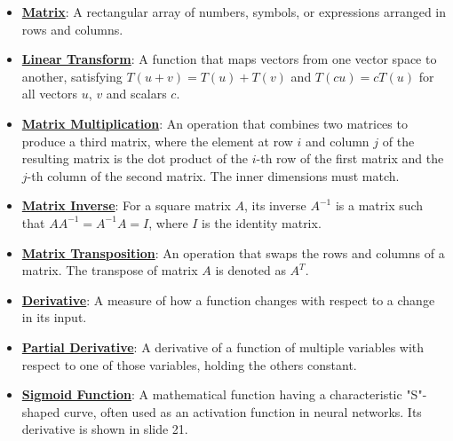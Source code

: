 \documentclass{article}%
\begin{document}
\begin{itemize}[leftmargin=*]%
\item \href{https://www.math.purdue.edu/~yipn/351/04L1-Linear Algebra Primer.pdf#page=4}{\textbf{Matrix}}: A rectangular array of numbers, symbols, or expressions arranged in rows and columns.%
\item \href{https://www.math.purdue.edu/~yipn/351/04L1-Linear Algebra Primer.pdf#page=5}{\textbf{Linear Transform}}: A function that maps vectors from one vector space to another, satisfying $T(u + v) = T(u) + T(v)$ and $T(cu) = cT(u)$ for all vectors $u$, $v$ and scalars $c$.%
\item \href{https://www.math.purdue.edu/~yipn/351/04L1-Linear Algebra Primer.pdf#page=14}{\textbf{Matrix Multiplication}}: An operation that combines two matrices to produce a third matrix, where the element at row $i$ and column $j$ of the resulting matrix is the dot product of the $i$-th row of the first matrix and the $j$-th column of the second matrix. The inner dimensions must match.%
\item \href{https://www.math.purdue.edu/~yipn/351/04L1-Linear Algebra Primer.pdf#page=10}{\textbf{Matrix Inverse}}: For a square matrix $A$, its inverse $A^{-1}$ is a matrix such that $AA^{-1} = A^{-1}A = I$, where $I$ is the identity matrix.%
\item \href{https://www.math.purdue.edu/~yipn/351/04L1-Linear Algebra Primer.pdf#page=16}{\textbf{Matrix Transposition}}: An operation that swaps the rows and columns of a matrix. The transpose of matrix $A$ is denoted as $A^T$.%
\item \href{https://www.math.purdue.edu/~yipn/351/04L1-Linear Algebra Primer.pdf#page=21}{\textbf{Derivative}}: A measure of how a function changes with respect to a change in its input.%
\item \href{https://www.math.purdue.edu/~yipn/351/04L1-Linear Algebra Primer.pdf#page=19}{\textbf{Partial Derivative}}: A derivative of a function of multiple variables with respect to one of those variables, holding the others constant.%
\item \href{https://www.math.purdue.edu/~yipn/351/04L1-Linear Algebra Primer.pdf#page=21}{\textbf{Sigmoid Function}}: A mathematical function having a characteristic "S"-shaped curve, often used as an activation function in neural networks. Its derivative is shown in slide 21.%
\end{itemize}%
\end{document}
